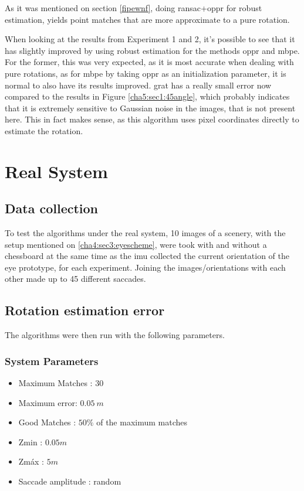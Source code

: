 As it was mentioned on section \ref{fipewnf}, doing \acrshort{ransac}+\acrshort{oppr} for robust estimation, yields point matches that are more approximate to a pure rotation.

When looking at the results from Experiment 1 and 2, it's possible to see that it has slightly improved by using robust estimation for the methods \acrshort{oppr} and \acrshort{mbpe}. For the former, this was very expected, as it is most accurate when dealing with pure rotations, as for \acrshort{mbpe} by taking \acrshort{oppr} as an initialization parameter, it is normal to also have its results improved. \acrshort{grat} has a really small error now compared to the results in Figure \ref{cha5:sec1:45angle}, which probably indicates that it is extremely sensitive to Gaussian noise in the images, that is not present here. This in fact makes sense, as this algorithm uses pixel coordinates directly to estimate the rotation.

\section{Real System}
\subsection{Data collection}
To test the algorithms under the real system, 10 images of a scenery, with the setup mentioned on \ref{cha4:sec3:eyescheme}, were took with and without a chessboard at the same time as the \acrshort{imu} collected the current orientation of the eye prototype, for each experiment. Joining the images/orientations with each other made up to 45 different saccades. 
\subsection{Rotation estimation error}
\label{fefwefesxs}
The algorithms were then run with the following parameters.
\subsubsection{System Parameters}
\begin{itemize}
	\item Maximum Matches : $30$
	\item Maximum error: $0.05 \ m$
	\item Good Matches : $50 \%$ of the maximum matches
	\item Zmin : $0.05 m$
	\item Zmáx : $5 m$
	\item Saccade amplitude : random
\end{itemize}

